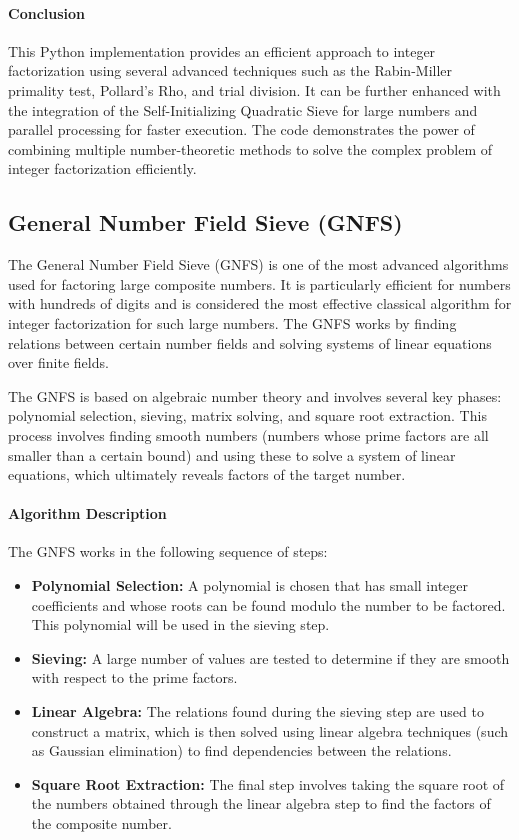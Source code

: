 \documentclass[12pt]{report}
\begin{document}
\paragraph{Conclusion}

This Python implementation provides an efficient approach to integer factorization using several advanced techniques such as the Rabin-Miller primality test, Pollard’s Rho, and trial division. It can be further enhanced with the integration of the Self-Initializing Quadratic Sieve for large numbers and parallel processing for faster execution. The code demonstrates the power of combining multiple number-theoretic methods to solve the complex problem of integer factorization efficiently.

\subsection{General Number Field Sieve (GNFS)}
The General Number Field Sieve (GNFS) is one of the most advanced algorithms used for factoring large composite numbers. It is particularly efficient for numbers with hundreds of digits and is considered the most effective classical algorithm for integer factorization for such large numbers. The GNFS works by finding relations between certain number fields and solving systems of linear equations over finite fields. 

The GNFS is based on algebraic number theory and involves several key phases: polynomial selection, sieving, matrix solving, and square root extraction. This process involves finding smooth numbers (numbers whose prime factors are all smaller than a certain bound) and using these to solve a system of linear equations, which ultimately reveals factors of the target number.

\paragraph{Algorithm Description}
The GNFS works in the following sequence of steps:
\begin{itemize}
    \item \textbf{Polynomial Selection:} A polynomial is chosen that has small integer coefficients and whose roots can be found modulo the number to be factored. This polynomial will be used in the sieving step.
    \item \textbf{Sieving:} A large number of values are tested to determine if they are smooth with respect to the prime factors.
    \item \textbf{Linear Algebra:} The relations found during the sieving step are used to construct a matrix, which is then solved using linear algebra techniques (such as Gaussian elimination) to find dependencies between the relations.
    \item \textbf{Square Root Extraction:} The final step involves taking the square root of the numbers obtained through the linear algebra step to find the factors of the composite number.
\end{itemize}
\end{document}
